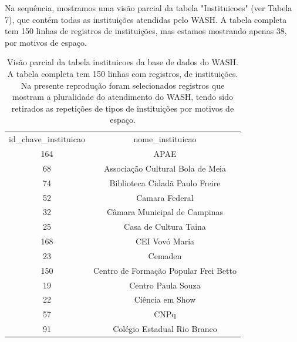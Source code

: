 Na sequência, mostramos uma visão parcial da tabela "Instituicoes" (ver Tabela 7), que contém todas as instituições atendidas pelo WASH. A tabela completa tem 150 linhas de registros de instituições, mas estamos mostrando apenas 38, por motivos de espaço.





\begin{table}[htb]
\tiny
\caption{\label{43d55cebe993e2a2e0f56024226e573b67122ac3}Visão parcial da tabela instituicoes da base de dados do WASH. A tabela completa tem 150 linhas com registros, de instituições. Na presente reprodução foram selecionados registros que mostram a pluralidade do atendimento do WASH, tendo sido retirados as repetições de tipos de instituições por motivos de espaço.}

\centering
\begin{tabular}{|c|c|}
\hline
id\_chave\_instituicao  &  nome\_instituicao \\
                  164  &  APAE  \\
                   68  &  Associação Cultural Bola de Meia \\
                   74  &  Biblioteca Cidadã Paulo Freire  \\
                   52  &  Camara Federal \\
                   32  &  Câmara Municipal de Campinas                                                      \\
                   25  &  Casa de Cultura Taina                                                             \\
                  168  &  CEI Vovó Maria                                                                    \\
                   23  &  Cemaden                                                                           \\
                  150  &  Centro de Formação Popular Frei Betto                                             \\
                   19  &  Centro Paula Souza                                                                \\
                   22  &  Ciência em Show                                                                   \\
                   57  &  CNPq                                                                              \\
                   91  &  Colégio Estadual Rio Branco                                                       \\

\end{tabular}
\end{table}
